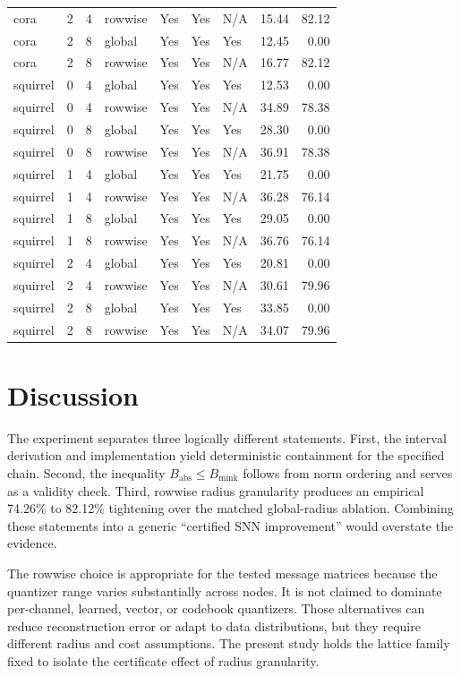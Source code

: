 \documentclass{article}
\begin{document}
\begin{table}[ht]
{\begin{tabular}{lrrllllrr}
cora & 2 & 4 & rowwise & Yes & Yes & N/A & 15.44 & 82.12 \\
cora & 2 & 8 & global & Yes & Yes & Yes & 12.45 & 0.00 \\
cora & 2 & 8 & rowwise & Yes & Yes & N/A & 16.77 & 82.12 \\
squirrel & 0 & 4 & global & Yes & Yes & Yes & 12.53 & 0.00 \\
squirrel & 0 & 4 & rowwise & Yes & Yes & N/A & 34.89 & 78.38 \\
squirrel & 0 & 8 & global & Yes & Yes & Yes & 28.30 & 0.00 \\
squirrel & 0 & 8 & rowwise & Yes & Yes & N/A & 36.91 & 78.38 \\
squirrel & 1 & 4 & global & Yes & Yes & Yes & 21.75 & 0.00 \\
squirrel & 1 & 4 & rowwise & Yes & Yes & N/A & 36.28 & 76.14 \\
squirrel & 1 & 8 & global & Yes & Yes & Yes & 29.05 & 0.00 \\
squirrel & 1 & 8 & rowwise & Yes & Yes & N/A & 36.76 & 76.14 \\
squirrel & 2 & 4 & global & Yes & Yes & Yes & 20.81 & 0.00 \\
squirrel & 2 & 4 & rowwise & Yes & Yes & N/A & 30.61 & 79.96 \\
squirrel & 2 & 8 & global & Yes & Yes & Yes & 33.85 & 0.00 \\
squirrel & 2 & 8 & rowwise & Yes & Yes & N/A & 34.07 & 79.96 \\
\bottomrule
\end{tabular}
}
\end{table}

\section{Discussion}


The experiment separates three logically different statements. First, the interval derivation and implementation yield deterministic containment for the specified chain. Second, the inequality \(B_{\mathrm{abs}}\le B_{\mathrm{mink}}\) follows from norm ordering and serves as a validity check. Third, rowwise radius granularity produces an empirical 74.26\% to 82.12\% tightening over the matched global-radius ablation. Combining these statements into a generic ``certified SNN improvement'' would overstate the evidence.

The rowwise choice is appropriate for the tested message matrices because the quantizer range varies substantially across nodes. It is not claimed to dominate per-channel, learned, vector, or codebook quantizers. Those alternatives can reduce reconstruction error or adapt to data distributions, but they require different radius and cost assumptions. The present study holds the lattice family fixed to isolate the certificate effect of radius granularity.
\end{document}
